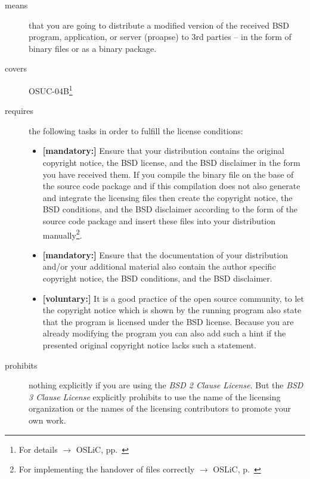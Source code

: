 \begin{description}
\item[means] that you are going to distribute a modified version of the received
BSD pro\-gram, application, or server (proapse) to 3rd parties -- in the form of
binary files or as a binary package.
\item[covers] OSUC-04B\footnote{For details $\rightarrow$ OSLiC, pp.\ \pageref{OSUC-04-DEF}}
\item[requires] the following tasks in order to fulfill the license conditions:
\begin{itemize}

  \item  \textbf{[mandatory:]} Ensure that your distribution contains the
  original copyright notice, the BSD license, and the BSD disclaimer in the form
  you have received them. If you compile the binary file on the base of the
  source code package and if this compilation does not also generate and
  integrate the licensing files then create the copyright notice, the BSD
  conditions, and the BSD disclaimer according to the form of the source code
  package and insert these files into your distribution manually\footnote{For
  implementing the handover of files correctly $\rightarrow$ OSLiC, p.\ 
  \pageref{DistributingFilesHint}}.

  \item  \textbf{[mandatory:]} Ensure that the documentation of your
  distribution and/or your additional material also contain the author specific
  copyright notice, the BSD conditions, and the BSD disclaimer.
  
  \item \textbf{[voluntary:]} It is a good practice of the open source
  community, to let the copyright notice which is shown by the running program
  also state that the program is licensed under the BSD license. Because you are
  already modifying the program you can also add such a hint if the presented
  original copyright notice lacks such a statement.
\end{itemize}

\item[prohibits] nothing explicitly if you are using the \emph{BSD 2 Clause
License}. But the \emph{BSD 3 Clause License} explicitly prohibits to use the
name of the licensing organization or the names of the licensing contributors to
promote your own work.

\end{description}

